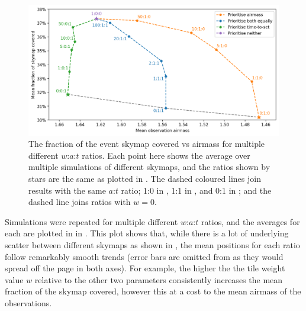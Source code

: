 \begin{colsection}
\begin{colsection}
\begin{figure}[t]
    \begin{center}
        \includegraphics[width=\linewidth]{images/sched_sim2.png}
    \end{center}
    \caption[Scheduler simulation results for different $w$:$a$:$t$ ratios]{
        The fraction of the event skymap covered vs airmass for multiple different $w$:$a$:$t$ ratios. Each point here shows the average over multiple simulations of different skymaps, and the ratios shown by stars are the same as plotted in . The dashed coloured lines join results with the same $a$:$t$ ratio; 1:0 in , 1:1 in , and 0:1 in ; and the  dashed line joins ratios with $w=0$.
    }\label{fig:scheduler_sim_results2}
\end{figure}

Simulations were repeated for multiple different $w$:$a$:$t$ ratios, and the averages for each are plotted in in . This plot shows that, while there is a lot of underlying scatter between different skymaps as shown in , the mean positions for each ratio follow remarkably smooth trends (error bars are omitted from  as they would spread off the page in both axes). For example, the higher the the tile weight value $w$ relative to the other two parameters consistently increases the mean fraction of the skymap covered, however this at a cost to the mean airmass of the observations.


\end{colsection}
\end{colsection}
